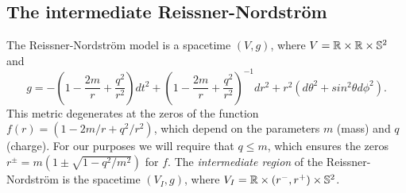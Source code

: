 



\subsection*{The intermediate  Reissner-Nordstr\"om}
The Reissner-Nordstr\"om model is a spacetime $(V,g)$, where $V={\mathbb R}\times {\mathbb R}\times \mathbb{S}^2$ and
\[
g=-\left(1-\frac{2m}{r}+\frac{q^{2}}{r^{2}}\right)dt^{2}+\left(1-\frac{2m}{r}+\frac{q^{2}}{r^{2}}\right)^{-1}dr^{2}+r^{2}(d\theta^{2}+sin^{2}\theta d\phi^{2}).
\]
 This metric degenerates at the zeros of the function $f(r)=(1-2m/r+q^2/r^2)$, which depend on the parameters $m$ (mass) and $q$ (charge). For our purposes we will require that $q\leq m$, which ensures the zeros $r^{\pm}=m\left( 1\pm\sqrt{1-q^2/m^2}\right)$ for $f$. The {\em intermediate region} of the Reissner-Nordstr\"om  is the spacetime $(V_I,g)$, where $V_I={\mathbb R}\times (r^-,r^+)\times \mathbb{S}^2$.

